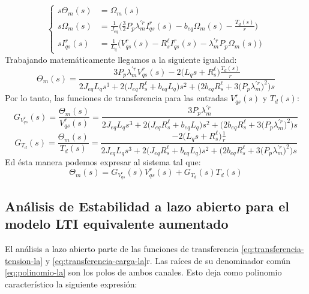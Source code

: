 \documentclass[blue,fullpaper]{ludusofficial}  %
\begin{document}
\begin{equation*}
\left\{
\begin{aligned}
s\Theta_m(s) &= \Omega_m(s)\\
s\Omega_m(s) &= \frac{1}{J_{eq}}\Big(\frac{3}{2}P_p\lambda^{'r}_mI^r_{qs}(s)-b_{eq}\Omega_m(s)-\frac{T_d(s)}{r}\Big)\\
sI^r_{qs}(s) &= \frac{1}{L_q}\Big(V^r_{qs}(s)-R^\ell_{s}I^r_{qs}(s)-\lambda^{'r}_mP_p\Omega_m(s)\Big)
\end{aligned}
\right.
\end{equation*}
Trabajando matemáticamente llegamos a la siguiente igualdad:
\begin{equation}
\label{eq:respuesta-posicion-la}
    \Theta_m(s) = \frac{3P_p\lambda_m^{'r}V_{qs}^r(s)-2\Big(L_qs+R^\ell_s\Big)\frac{T_d(s)}{r}}{2J_{eq}L_qs^3+2\Big(J_{eq}R_s^\ell+b_{eq}L_q\Big)s^2+\Big(2b_{eq}R_s^\ell+3\Big(P_p\lambda^{'r}_m\Big)^2\Big)s}
\end{equation}
Por lo tanto, las funciones de transferencia para las entradas $V^r_{qs}(s)$ y $T_d(s)$:
\begin{equation}
\label{eq:transferencia-tension-la}
    G_{V^r_{qs}}(s)=\frac{\Theta_m(s)}{V_{qs}^r(s)} = \frac{3P_p\lambda_m^{'r}}{2J_{eq}L_qs^3+2\Big(J_{eq}R_s^\ell+b_{eq}L_q\Big)s^2+\Big(2b_{eq}R_s^\ell+3\Big(P_p\lambda^{'r}_m\Big)^2\Big)s}    
\end{equation}
\begin{equation}
\label{eq:transferencia-carga-la}
    G_{T_d}(s)=\frac{\Theta_m(s)}{T_d(s)}= \frac{-2\Big(L_qs+R^\ell_s\Big)\frac{1}{r}}{2J_{eq}L_qs^3+2\Big(J_{eq}R_s^\ell+b_{eq}L_q\Big)s^2+\Big(2b_{eq}R_s^\ell+3\Big(P_p\lambda^{'r}_m\Big)^2\Big)s}
\end{equation}
Ed ésta manera podemos expresar al sistema tal que: 
\begin{equation}
\label{eq:superposicion-la}
    \Theta_m(s)=G_{V^r_{qs}}(s)V^r_{qs}(s)+G_{T_d}(s)T_d(s)
\end{equation}
\subsection{Análisis de Estabilidad a lazo abierto para el modelo LTI equivalente aumentado}

El análisis a lazo abierto parte de las funciones de transferencia
\eqref{eq:transferencia-tension-la} y \eqref{eq:transferencia-carga-la}r. Las raíces de su denominador común \eqref{eq:polinomio-la} son los polos de ambos
canales. Esto deja como polinomio característico la siguiente expresión:
\end{document}
